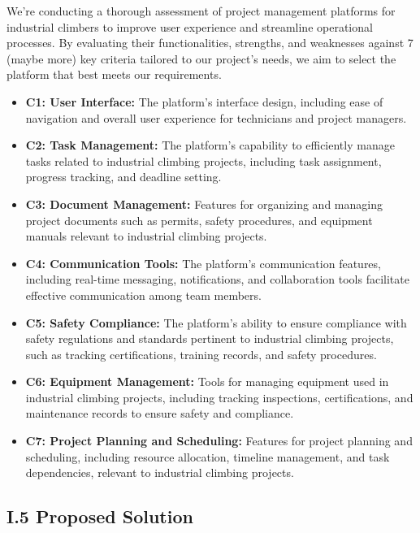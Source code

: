 We're conducting a thorough assessment of project management platforms for industrial climbers to improve user experience and streamline operational processes. By evaluating their functionalities, strengths, and weaknesses against 7 (maybe more) key criteria tailored to our project's needs, we aim to select the platform that best meets our requirements.

\begin{itemize}
    \item \textbf{C1: User Interface:} The platform's interface design, including ease of navigation and overall user experience for technicians and project managers.
    \item \textbf{C2: Task Management:} The platform's capability to efficiently manage tasks related to industrial climbing projects, including task assignment, progress tracking, and deadline setting.
    \item \textbf{C3: Document Management:} Features for organizing and managing project documents such as permits, safety procedures, and equipment manuals relevant to industrial climbing projects.
    \item \textbf{C4: Communication Tools:} The platform's communication features, including real-time messaging, notifications, and collaboration tools facilitate effective communication among team members.
    \item \textbf{C5: Safety Compliance:} The platform's ability to ensure compliance with safety regulations and standards pertinent to industrial climbing projects, such as tracking certifications, training records, and safety procedures.
    \item \textbf{C6: Equipment Management:} Tools for managing equipment used in industrial climbing projects, including tracking inspections, certifications, and maintenance records to ensure safety and compliance.
    \item \textbf{C7: Project Planning and Scheduling:} Features for project planning and scheduling, including resource allocation, timeline management, and task dependencies, relevant to industrial climbing projects.
\end{itemize}

\subsection*{I.5 Proposed Solution}
\setlength{\parskip}{1em}

